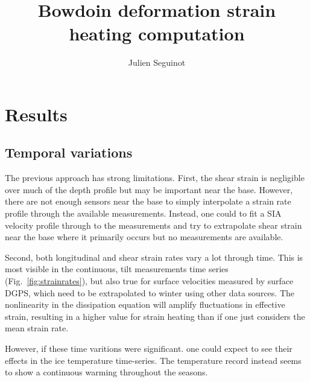 \documentclass[utf8]{article}
\title{Bowdoin deformation strain heating computation}
\author[1]{Julien Seguinot}
\affil[1]{Laboratory of Hydraulics, Hydrology and Glaciology,
          ETH Zürich, Switzerland}
\begin{document}



\section{Results}

\subsection{Temporal variations}

    The previous approach has strong limitations.  First, the shear strain is
    negligible over much of the depth profile but may be important near the
    base. However, there are not enough sensors near the base to simply
    interpolate a strain rate profile through the available measurements.
    Instead, one could to fit a SIA velocity profile through to the
    measurements and try to extrapolate shear strain near the base where it
    primarily occurs but no measurements are available.

    Second, both longitudinal and shear strain rates vary a lot through time.
    This is most visible in the continuous, tilt measurements time series
    (Fig.~\ref{fig:strainrates}), but also true for surface velocities
    measured by surface DGPS, which need to be extrapolated to winter using
    other data sources. The nonlinearity in the dissipation equation will
    amplify fluctuations in effective strain, resulting in a higher value for
    strain heating than if one just considers the mean strain rate.

    However, if these time varitions were significant. one could expect to see
    their effects in the ice temperature time-series. The temperature record
    instead seems to show a continuous warming throughout the seasons.


\end{document}
